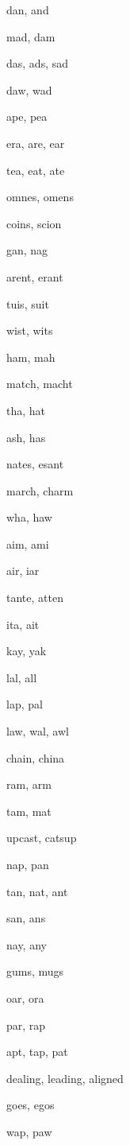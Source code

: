     \item dan, and
    \item mad, dam
    \item das, ads, sad
    \item daw, wad
    \item ape, pea
    \item era, are, ear
    \item tea, eat, ate
    \item omnes, omens
    \item coins, scion
    \item gan, nag
    \item arent, erant
    \item tuis, suit
    \item wist, wits
    \item ham, mah
    \item match, macht
    \item tha, hat
    \item ash, has
    \item nates, esant
    \item march, charm
    \item wha, haw
    \item aim, ami
    \item air, iar
    \item tante, atten
    \item ita, ait
    \item kay, yak
    \item lal, all
    \item lap, pal
    \item law, wal, awl
    \item chain, china
    \item ram, arm
    \item tam, mat
    \item upcast, catsup
    \item nap, pan
    \item tan, nat, ant
    \item san, ans
    \item nay, any
    \item gums, mugs
    \item oar, ora
    \item par, rap
    \item apt, tap, pat
    \item dealing, leading, aligned
    \item goes, egos
    \item wap, paw
